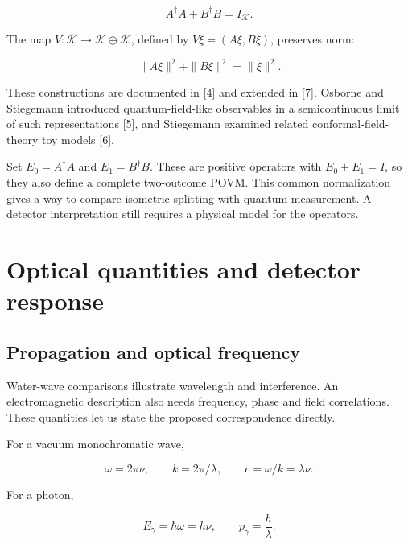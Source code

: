 \documentclass[11pt,a4paper]{article}
\begin{document}
\begin{equation}\label{eq:6}
\boxed{A^\dagger A+B^\dagger B=I_{\mathcal K}}.
\end{equation}

The map \(V:\mathcal K\to\mathcal K\oplus\mathcal K\), defined by \(V\xi=(A\xi,B\xi)\), preserves norm:

\begin{equation}\label{eq:7}
\|A\xi\|^2+\|B\xi\|^2=\|\xi\|^2.
\end{equation}

These constructions are documented in {[}4{]} and extended in {[}7{]}. Osborne and Stiegemann introduced quantum-field-like observables in a semicontinuous limit of such representations {[}5{]}, and Stiegemann examined related conformal-field-theory toy models {[}6{]}.

Set \(E_0=A^\dagger A\) and \(E_1=B^\dagger B\). These are positive operators with \(E_0+E_1=I\), so they also define a complete two-outcome POVM. This common normalization gives a way to compare isometric splitting with quantum measurement. A detector interpretation still requires a physical model for the operators.

\hypertarget{optical-quantities-and-detector-response}{%
\section{Optical quantities and detector response}\label{optical-quantities-and-detector-response}}

\hypertarget{propagation-and-optical-frequency}{%
\subsection{Propagation and optical frequency}\label{propagation-and-optical-frequency}}

Water-wave comparisons illustrate wavelength and interference. An electromagnetic description also needs frequency, phase and field correlations. These quantities let us state the proposed correspondence directly.

For a vacuum monochromatic wave,

\begin{equation}\label{eq:8}
\omega=2\pi\nu,\qquad k=2\pi/\lambda,\qquad c=\omega/k=\lambda\nu.
\end{equation}

For a photon,

\begin{equation}\label{eq:9}
E_\gamma=\hbar\omega=h\nu,\qquad p_\gamma=\frac{h}{\lambda}.
\end{equation}
\end{document}
